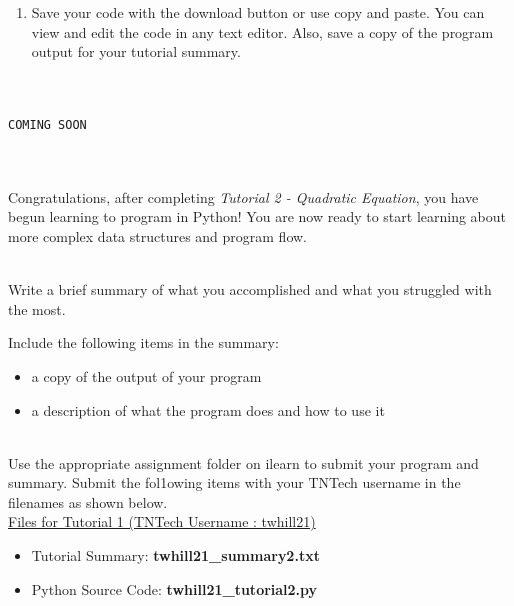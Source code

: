 \documentclass[12pt]{article}
\begin{document}
\begin{description}[labelindent=1cm]
\begin{enumerate}
		\item Save your code with the download button or use copy and paste. You can view and edit the code in any text editor. Also, save a copy of the program output for your tutorial summary. \\\\

	\end{enumerate}

\newpage
\item[\textbf{\underline{Solution Code:}}] \hfill \vspace{0mm}

\begin{lstlisting}

COMING SOON
	
\end{lstlisting}

\item[\textbf{\underline{Tutorial Complete:}}] \hfill \vspace{3mm}\\ 
	Congratulations, after completing {\it Tutorial 2 - Quadratic Equation}, you have begun learning to program in Python! You are now ready to start learning about more complex data structures and program flow. \\


\newpage
\item[\textbf{\underline{Tutorial Summary:}}] \hfill \vspace{3mm}\\ 
Write a brief summary of what you accomplished and what you struggled with the most. 

Include the following items in the summary:
\begin{itemize}

\item a copy of the output of your program
\item a description of what the program does and how to use it

\end{itemize}


\item[\textbf{\underline{Submission on Teams:}}] \hfill \vspace{3mm}\\ 
Use the appropriate assignment folder on ilearn to submit your program and summary. Submit the fol1owing items with your TNTech username in the filenames as shown below. \vspace{0mm}\\

\underline{Files for Tutorial 1 (TNTech Username : twhill21)}

\begin{itemize}

\item Tutorial Summary: \textbf{ twhill21\_summary2.txt}

\item Python Source Code: \textbf{ twhill21\_tutorial2.py}

\end{itemize}


\end{description}
\end{document}
